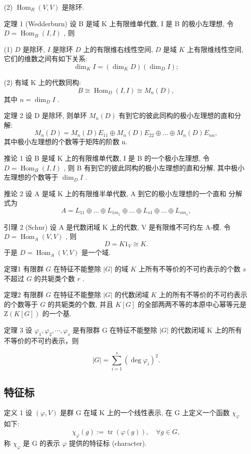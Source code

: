 \documentclass[]{article}
\begin{document}
(2) $\operatorname{Hom}_R(V, V)$ 是除环. 

定理 1 (Wedderburn) 设 B 是域 K 上有限维单代数, I 是 B 的极小左理想, 令 $D = \operatorname{Hom}_{B}(I, I)$ , 则 

(1) $D$ 是除环, $I$ 是除环 $D$ 上的有限维右线性空间, $D$ 是域 $K$ 上有限维线性空间, 它们的维数之间有如下关系: $$
\dim_ {K} I = (\dim_ {K} D) (\dim_ {D} I); 
$$

(2) 有域 K 上的代数同构: $$
B \cong \operatorname{Hom} _ {D} (I, I) \cong M _ {n} (D), 
$$其中 $n = \dim_{D} I$ . 

定理 2 设 D 是除环, 则单环 $M_{n}(D)$ 有到它的彼此同构的极小左理想的直和分解: $$
M _ {n} (D) = M _ {n} (D) E _ {1 1} \oplus M _ {n} (D) E _ {2 2} \oplus \dots \oplus M _ {n} (D) E _ {n n}, 
$$其中极小左理想的个数等于矩阵的阶数 n. 

推论 1 设 B 是域 K 上的有限维单代数, I 是 B 的一个极小左理想, 令 $D = \operatorname{Hom}_{B}(I, I)$ , 则 B 有到它的彼此同构的极小左理想的直和分解, 其中极小左理想的个数等于 $\dim_{D} I$ . 

推论 2 设 A 是域 K 上的有限维半单代数, A 到它的极小左理想的一个直和 
分解式为$$
A = L _ {1 1} \oplus \dots \oplus L _ {1 m _ {1}} \oplus \dots \oplus L _ {s 1} \oplus \dots \oplus L _ {s m _ {s}}, 
$$ 

引理 2 (Schnr) 设 A 是代数闭域 K 上的代数, V 是有限维不可约左 A-模. 令 $D = \operatorname{Hom}_{A}(V, V)$ , 则 $$
D = K 1 _ {V} \cong K. 
$$
于是 $D = \operatorname{Hom}_{A}(V, V)$ 是一个域. 

定理1 有限群 $G$ 在特征不能整除 $|G|$ 的域 $K$ 上所有不等价的不可约表示的个数 $s$ 不超过 $G$ 的共轭类个数 $r$ . 

定理2 有限群 $G$ 在特征不能整除 $|G|$ 的代数闭域 $K$ 上的所有不等价的不可约表示的个数等于 $G$ 的共轭类的个数, 并且 $K[G]$ 的全部两两不等的本原中心幂等元是 $\mathrm{Z}(K[G])$ 的一个基. 

定理 3 设 $\varphi_{1}, \varphi_{2}, \cdots, \varphi_{s}$ 是有限群 G 在特征不能整除 $|G|$ 的代数闭域 K 上的所有不等价的不可约表示，则 

$$
| G | = \sum_ {i = 1} ^ {s} (\deg \varphi_ {i}) ^ {2}. 
$$

\subsection{特征标}

定义 1 设 $(\varphi, V)$ 是群 G 在域 K 上的一个线性表示, 在 G 上定义一个函数 $\chi_{\varphi}$ 如下: $$
\chi_ {\varphi} (g) := \operatorname{tr} (\varphi (g)), \quad \forall g \in G, 
$$称 $\chi_{\varphi}$ 是 G 的表示 $\varphi$ 提供的特征标 (character). 
\end{document}
